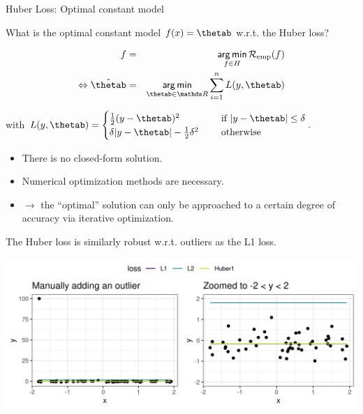 \begin{vbframe}{Huber Loss: Optimal constant model}

What is the optimal constant model $\fx = \thetab$ w.r.t. the Huber loss?

\vspace{-0.2cm}
\begin{eqnarray*}
f &=& \argmin_{f \in \Hspace} \riskef\\
\Leftrightarrow
\hat \thetab&=& \argmin_{\thetab\in \R} \sumin L(y, \thetab)
\end{eqnarray*}

with $L(y, \thetab) = \begin{cases}
  \frac{1}{2}(y - \thetab)^2  & \text{ if } |y - \thetab| \le \delta \\
  \delta |y - \thetab|-\frac{1}{2}\delta^2 \quad & \text{ otherwise }
  \end{cases}. $

\begin{itemize}
\item There is no closed-form solution.
\item Numerical optimization methods are necessary.
\item $\to$  the \enquote{optimal} solution can only be approached to a certain degree of accuracy via iterative optimization.
\end{itemize}


\framebreak 

The Huber loss is similarly robust w.r.t. outliers as the L1 loss. 

\vspace{0.2cm}

\begin{center}
\includegraphics[width = 1\textwidth ]{figure_man/Huber-outlier.png} \\
\end{center}


\end{vbframe}

